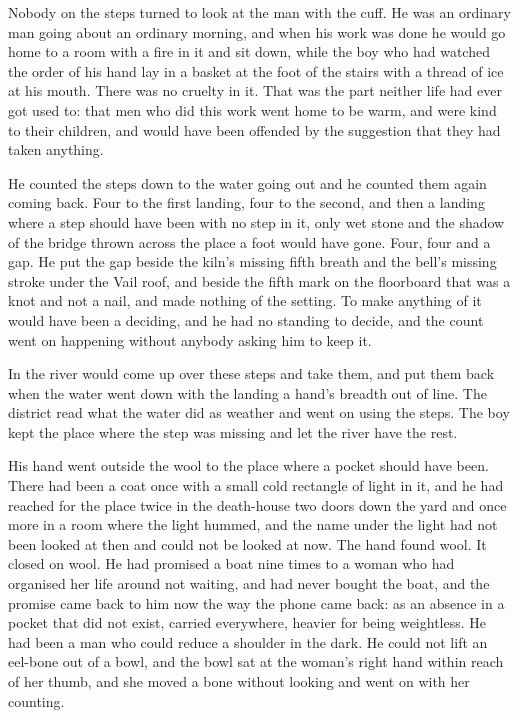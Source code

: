 Nobody on the steps turned to look at the man with the cuff. He was an ordinary man going about an ordinary morning, and when his work was done he would go home to a room with a fire in it and sit down, while the boy who had watched the order of his hand lay in a basket at the foot of the stairs with a thread of ice at his mouth. There was no cruelty in it. That was the part neither life had ever got used to: that men who did this work went home to be warm, and were kind to their children, and would have been offended by the suggestion that they had taken anything.

He counted the steps down to the water going out and he counted them again coming back. Four to the first landing, four to the second, and then a landing where a step should have been with no step in it, only wet stone and the shadow of the bridge thrown across the place a foot would have gone. Four, four and a gap. He put the gap beside the kiln's missing fifth breath and the bell's missing stroke under the Vail roof, and beside the fifth mark on the floorboard that was a knot and not a nail, and made nothing of the setting. To make anything of it would have been a deciding, and he had no standing to decide, and the count went on happening without anybody asking him to keep it.

In  the river would come up over these steps and take them, and put them back when the water went down with the landing a hand's breadth out of line. The district read what the water did as weather and went on using the steps. The boy kept the place where the step was missing and let the river have the rest.

His hand went outside the wool to the place where a pocket should have been. There had been a coat once with a small cold rectangle of light in it, and he had reached for the place twice in the death-house two doors down the yard and once more in a room where the light hummed, and the name under the light had not been looked at then and could not be looked at now. The hand found wool. It closed on wool. He had promised a boat nine times to a woman who had organised her life around not waiting, and had never bought the boat, and the promise came back to him now the way the phone came back: as an absence in a pocket that did not exist, carried everywhere, heavier for being weightless. He had been a man who could reduce a shoulder in the dark. He could not lift an eel-bone out of a bowl, and the bowl sat at the woman's right hand within reach of her thumb, and she moved a bone without looking and went on with her counting.

